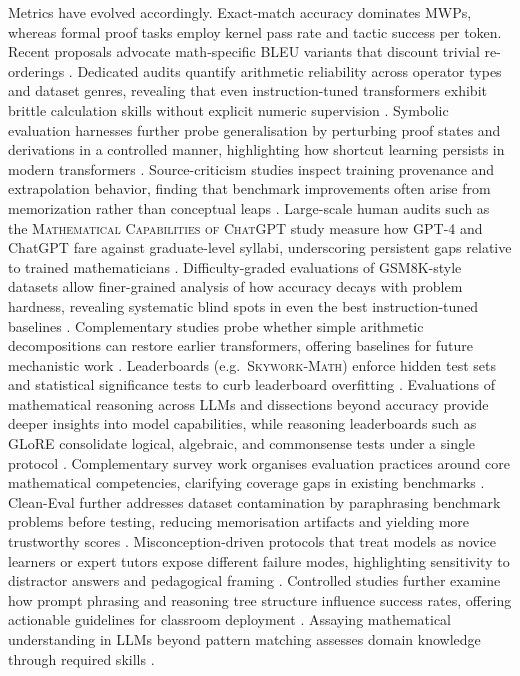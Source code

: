 \documentclass[acmsmall,anonymous]{acmart}
\begin{document}
Metrics have evolved accordingly.  Exact‐match accuracy dominates MWPs, whereas formal proof tasks employ kernel pass rate and tactic success per token.  Recent proposals advocate math‐specific BLEU variants that discount trivial re-orderings \cite{li2024benchmarkingllmmath}. Dedicated audits quantify arithmetic reliability across operator types and dataset genres, revealing that even instruction-tuned transformers exhibit brittle calculation skills without explicit numeric supervision \cite{yuan-2023-arithmetic-eval}.  Symbolic evaluation harnesses further probe generalisation by perturbing proof states and derivations in a controlled manner, highlighting how shortcut learning persists in modern transformers \cite{meadows-2024-symbolic-framework}.  Source-criticism studies inspect training provenance and extrapolation behavior, finding that benchmark improvements often arise from memorization rather than conceptual leaps \cite{yousefzadeh-2023-source-criticism}.  Large-scale human audits such as the \textsc{Mathematical Capabilities of ChatGPT} study measure how GPT-4 and ChatGPT fare against graduate-level syllabi, underscoring persistent gaps relative to trained mathematicians \cite{frieder-2023-math-capabilities}.  Difficulty-graded evaluations of GSM8K-style datasets allow finer-grained analysis of how accuracy decays with problem hardness, revealing systematic blind spots in even the best instruction-tuned baselines \cite{liu-2023-large-scale-mwp-eval}.  Complementary studies probe whether simple arithmetic decompositions can restore earlier transformers, offering baselines for future mechanistic work \cite{muffo2023evaluatingtransformerlanguagemodels}.  Leaderboards (e.g.\ \textsc{Skywork‐Math}) enforce hidden test sets and statistical significance tests to curb leaderboard overfitting \cite{zeng2024skywork}. Evaluations of mathematical reasoning across LLMs \cite{anonymous2025evaluatingmathreasoning,anonymous2025evaluationmathsolving,anonymous2025evaluationmathsolving,anonymous2025evaluatingmathreasoning} and dissections beyond accuracy \cite{anonymous2025beyondaccuracy,anonymous2025beyondaccuracy} provide deeper insights into model capabilities, while reasoning leaderboards such as GLoRE consolidate logical, algebraic, and commonsense tests under a single protocol \cite{liu-2025-glore}.  Complementary survey work organises evaluation practices around core mathematical competencies, clarifying coverage gaps in existing benchmarks \cite{zhuang-2023-core-competency-survey}.  Clean-Eval further addresses dataset contamination by paraphrasing benchmark problems before testing, reducing memorisation artifacts and yielding more trustworthy scores \cite{zhu2024cleanevalcleanevaluationcontaminated}. Misconception-driven protocols that treat models as novice learners or expert tutors expose different failure modes, highlighting sensitivity to distractor answers and pedagogical framing \cite{liu-2023-novice-expert}.  Controlled studies further examine how prompt phrasing and reasoning tree structure influence success rates, offering actionable guidelines for classroom deployment \cite{jie-2023-design-cot,chang-2023-rocling-math}. Assaying mathematical understanding in LLMs beyond pattern matching assesses domain knowledge through required skills \cite{guo2024learning}.  
\end{document}
